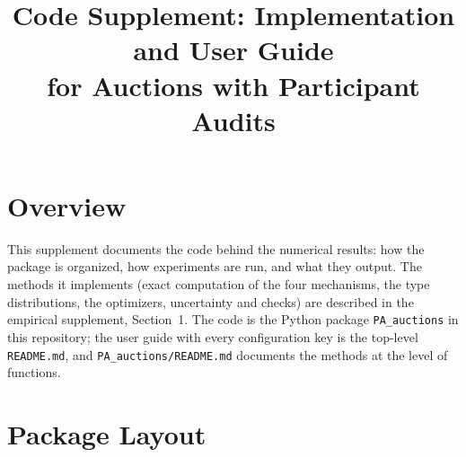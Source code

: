 \documentclass[11pt]{article}
\title{Code Supplement: Implementation and User Guide\\for Auctions with Participant Audits}
\author{}
\date{}
\newcommand{\code}[1]{\texttt{#1}}
\begin{document}
\maketitle

\section{Overview}\label{sec:overview}

This supplement documents the code behind the numerical results: how the package is organized, how experiments are run, and what they output. The methods it implements (exact computation of the four mechanisms, the type distributions, the optimizers, uncertainty and checks) are described in the empirical supplement, Section~1. The code is the Python package \code{PA\_auctions} in this repository; the user guide with every configuration key is the top-level \code{README.md}, and \code{PA\_auctions/README.md} documents the methods at the level of functions.

\section{Package Layout}\label{sec:layout}
\end{document}
